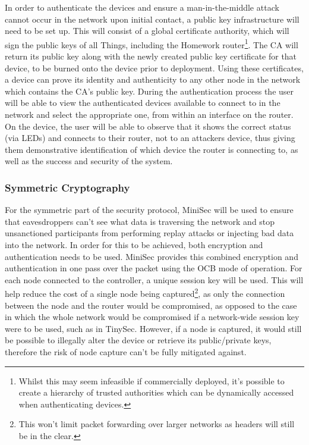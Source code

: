 \documentclass{mprop}
\begin{document}
In order to authenticate the devices and ensure a man-in-the-middle attack cannot occur in the network upon initial contact, a public key infrastructure will need to be set up. This will consist of a global certificate authority, which will sign the public keys of all Things, including the Homework router\footnote{Whilst this may seem infeasible if commercially deployed, it's possible to create a hierarchy of trusted authorities which can be dynamically accessed when authenticating devices.}. The CA will return its public key along with the newly created public key certificate for that device, to be burned onto the device prior to deployment. Using these certificates, a device can prove its identity and authenticity to any other node in the network which contains the CA's public key. During the authentication process the user will be able to view the authenticated devices available to connect to in the network and select the appropriate one, from within an interface on the router. On the device, the user will be able to observe that it shows the correct status (via LEDs) and connects to their router, not to an attackers device, thus giving them demonstrative identification of which device the router is connecting to, as well as the success and security of the system.

\subsubsection{Symmetric Cryptography} %
\label{ssub:symmetric_key_cryptography}
For the symmetric part of the security protocol, MiniSec\cite{MiniSec} will be used to ensure that eavesdroppers can't see what data is traversing the network and stop unsanctioned participants from performing replay attacks or injecting bad data into the network. In order for this to be achieved, both encryption and authentication needs to be used. MiniSec provides this combined encryption and authentication in one pass over the packet using the OCB mode of operation. For each node connected to the controller, a unique session key will be used. This will help reduce the cost of a single node being captured\footnote{This won't limit packet forwarding over larger networks as headers will still be in the clear.}, as only the connection between the node and the router would be compromised, as opposed to the case in which the whole network would be compromised if a network-wide session key were to be used, such as in TinySec\cite{TinySec}. However, if a node is captured, it would still be possible to illegally alter the device or retrieve its public/private keys, therefore the risk of node capture can't be fully mitigated against.
\end{document}
